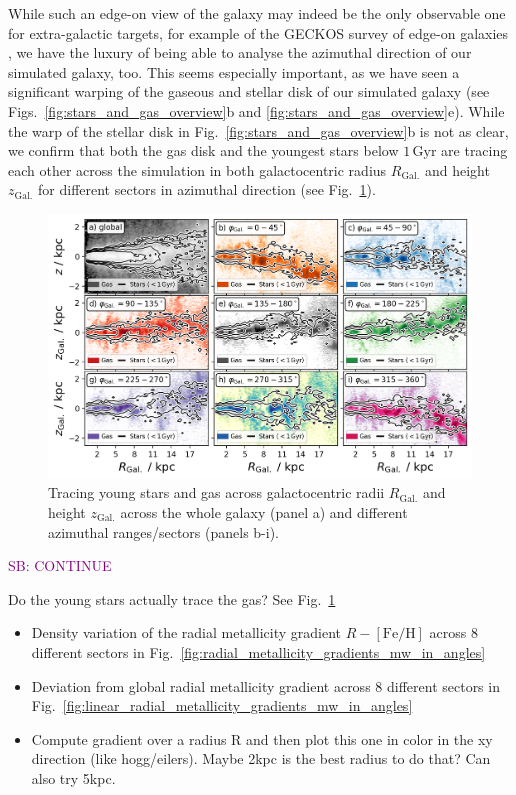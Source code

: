 \documentclass[fleqn,usenatbib]{mnras}
\newcommand{\SB}[1]{{\textcolor{purple}{SB: #1}}}
\begin{document}
While such an edge-on view of the galaxy may indeed be the only observable one for extra-galactic targets, for example of the GECKOS survey of edge-on galaxies \citep{GECKOS2023}, we have the luxury of being able to analyse the azimuthal direction of our simulated galaxy, too. This seems especially important, as we have seen a significant warping of the gaseous and stellar disk of our simulated galaxy (see Figs.~\ref{fig:stars_and_gas_overview}b and \ref{fig:stars_and_gas_overview}e). While the warp of the stellar disk in Fig.~\ref{fig:stars_and_gas_overview}b is not as clear, we confirm that both the gas disk and the youngest stars below $1\,\mathrm{Gyr}$ are tracing each other across the simulation in both galactocentric radius $R_\mathrm{Gal.}$ and height $z_\mathrm{Gal.}$ for different sectors in azimuthal direction (see Fig.~\ref{fig:tracing_young_stars_and_gas_in_angles}).

\begin{figure}
    \centering
    \includegraphics[width=\columnwidth]{figures/tracing_young_stars_and_gas_in_angles.png}
    \caption{Tracing young stars and gas across galactocentric radii $R_\mathrm{Gal.}$ and height $z_\mathrm{Gal.}$ across the whole galaxy (panel a) and different azimuthal ranges/sectors (panels b-i).}
    \label{fig:tracing_young_stars_and_gas_in_angles}
\end{figure}


\SB{CONTINUE}

Do the young stars actually trace the gas? See Fig.~\ref{fig:tracing_young_stars_and_gas_in_angles}





\begin{itemize}
    \item Density variation of the radial metallicity gradient $R-\mathrm{[Fe/H]}$ across 8 different sectors in Fig.~\ref{fig:radial_metallicity_gradients_mw_in_angles}
    \item Deviation from global radial metallicity gradient across 8 different sectors in Fig.~\ref{fig:linear_radial_metallicity_gradients_mw_in_angles}
    \item Compute gradient over a radius R and then plot this one in color in the xy direction (like hogg/eilers). Maybe 2kpc is the best radius to do that? Can also try 5kpc.
\end{itemize}
\end{document}
